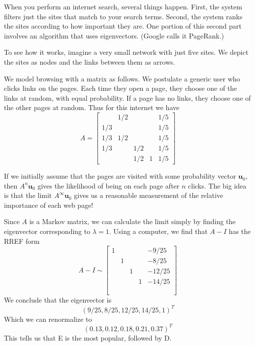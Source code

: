 \documentclass[11pt,oneside]{amsbook}
\theoremstyle{definition}
\theoremstyle{plain}
\theoremstyle{definition}
\theoremstyle{remark}
\numberwithin{equation}{section}
\numberwithin{figure}{section}
\begin{document}
When you perform an internet search, several things happen. First, the system filters just the sites that match to your search terms. Second, the system ranks the sites according to how important they are. One portion of this second part involves an algorithm that uses eigenvectors. (Google calls it PageRank.)

To see how it works, imagine a very small network with just five sites. We depict the sites as nodes and the links between them as arrows.
\begin{center}
\end{center}

We model browsing with a matrix as follows. We postulate a generic user who clicks links on the pages. Each time they open a page, they choose one of the links at random, with equal probability. If a page has no links, they choose one of the other pages at random. Thus for this internet we have
\[A=\begin{bmatrix}
    &1/2&&&1/5\\
    1/3&&&&1/5\\
    1/3&1/2&&&1/5\\
    1/3&&1/2&&1/5\\
    &&1/2&1&1/5
  \end{bmatrix}
\]

If we initially assume that the pages are visited with some probability vector $\bm{u}_0$, then $A^n\bm{u}_0$ gives the likelihood of being on each page after $n$ clicks. The big idea is that the limit $A^\infty\bm{u}_0$ gives us a reasonable measurement of the relative importance of each web page!

Since $A$ is a Markov matrix, we can calculate the limit simply by finding the eigenvector corresponding to $\lambda=1$. Using a computer, we find that $A-I$ has the RREF form
\[A-I\sim\begin{bmatrix}
    1&&&&-9/25\\
    &1&&&-8/25\\
    &&1&&-12/25\\
    &&&1&-14/25\\
    \phantom{1}
  \end{bmatrix}
\]
We conclude that the eigenvector is
\[(9/25,8/25,12/25,14/25,1)^T
\]
Which we can renormalize to
\[(0.13,0.12,0.18,0.21,0.37)^T
\]
This tells us that E is the most popular, followed by D.
\end{document}
